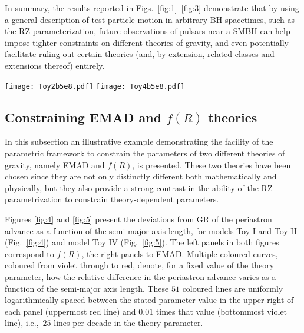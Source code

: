 \documentclass[a4paper,aps,twocolumn,showpacs,showkeys,nofootinbib,preprintnumbers,superscriptaddress,amsmath,amssymb,amsfonts]{revtex4-1}
\newcommand{\ie}{{i.e.,}~}
\begin{document}
In summary, the results reported in
Figs.~\ref{fig:1}--\ref{fig:3} demonstrate that by using a
general description of test-particle motion in arbitrary BH spacetimes,
such as the RZ parameterization, future observations of pulsars
near a SMBH can help impose tighter constraints on 
different theories of gravity, and even potentially facilitate
ruling out certain theories 
(and, by extension, related classes and extensions thereof) entirely.


\begin{figure*}
\begin{center}
\texttt{[image: Toy2b5e8.pdf]}
\hspace{1.0cm}
\texttt{[image: Toy4b5e8.pdf]}
\caption{Constraints set by the pulsar orbits for toy models II and IV in
the EMAD metric \eqref{EMAD} at zeroth order, with dilaton parameter
fixed at $\hat{b}=5 \times 10^{-8}$.
The values of the coefficients $a_0$ and $\epsilon$ are
constrained by the observations of the periastron advance 
(light-blue shaded areas around the solid blue line) and of the orbital period
(light-red shaded areas around the solid red line) 
assuming an accuracy of $10^{-4}$.
}
\label{fig:3}
\end{center}
\end{figure*}


\subsection{Constraining EMAD and $f(R)$ theories}
\label{sei.tre}
%
In this subsection an illustrative example demonstrating the facility of the
parametric framework to constrain the parameters of two different
theories of gravity, namely EMAD and $f(R)$, is presented.
These two theories have been chosen since they are not only distinctly
different both mathematically and physically, but they also provide a strong contrast
in the ability of the RZ parametrization to constrain theory-dependent parameters.

Figures \ref{fig:4} and \ref{fig:5} present the deviations from GR of the periastron
advance as a function of the semi-major axis length, for models Toy I and Toy II
(Fig.~\ref{fig:4}) and model Toy IV (Fig.~\ref{fig:5}).
The left panels in both figures correspond to $f(R)$,
the right panels to EMAD.
Multiple coloured curves, coloured from violet through to red, denote,
for a fixed value of the theory parameter, how the relative difference in the
periastron advance varies as a function of the semi-major axis length.
These $51$ coloured lines are uniformly logarithmically spaced between the stated
parameter value in the upper right of each panel (uppermost red line) 
and $0.01$ times that value (bottommost violet line),
\ie $25$ lines per decade in the theory parameter.
\end{document}
